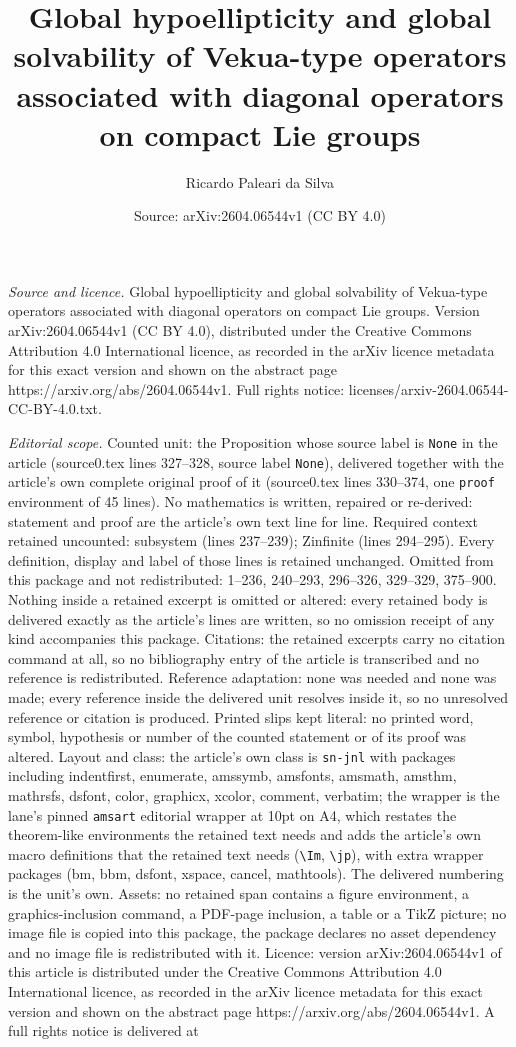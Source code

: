 \documentclass[10pt,a4paper]{amsart}
\title[Global hypoellipticity and global solvability of Vekua-type ]{Global hypoellipticity and global solvability of Vekua-type operators associated with diagonal operators on compact Lie groups}
\author{Ricardo Paleari da Silva}
\date{Source: arXiv:2604.06544v1 (CC BY 4.0)}
\begin{document}
\maketitle

\noindent\emph{Source and licence.} Global hypoellipticity and global solvability of Vekua-type operators associated with diagonal operators on compact Lie groups. Version arXiv:2604.06544v1 (CC BY 4.0), distributed under the Creative Commons Attribution 4.0 International licence, as recorded in the arXiv licence metadata for this exact version and shown on the abstract page https://arxiv.org/abs/2604.06544v1. Full rights notice: licenses/arxiv-2604.06544-CC-BY-4.0.txt.\par\smallskip

\noindent\textit{Editorial scope.} Counted unit: the Proposition whose source label is \texttt{None} in the article (source0.tex lines 327--328, source label \texttt{None}), delivered together with the article's own complete original proof of it (source0.tex lines 330--374, one \texttt{proof} environment of 45 lines). No mathematics is written, repaired or re-derived: statement and proof are the article's own text line for line. Required context retained uncounted: subsystem (lines 237--239); Zinfinite (lines 294--295). Every definition, display and label of those lines is retained unchanged. Omitted from this package and not redistributed: 1--236, 240--293, 296--326, 329--329, 375--900. Nothing inside a retained excerpt is omitted or altered: every retained body is delivered exactly as the article's lines are written, so no omission receipt of any kind accompanies this package. Citations: the retained excerpts carry no citation command at all, so no bibliography entry of the article is transcribed and no reference is redistributed. Reference adaptation: none was needed and none was made; every reference inside the delivered unit resolves inside it, so no unresolved reference or citation is produced. Printed slips kept literal: no printed word, symbol, hypothesis or number of the counted statement or of its proof was altered. Layout and class: the article's own class is \texttt{sn-jnl} with packages including indentfirst, enumerate, amssymb, amsfonts, amsmath, amsthm, mathrsfs, dsfont, color, graphicx, xcolor, comment, verbatim; the wrapper is the lane's pinned \texttt{amsart} editorial wrapper at 10pt on A4, which restates the theorem-like environments the retained text needs and adds the article's own macro definitions that the retained text needs (\texttt{\textbackslash Im}, \texttt{\textbackslash jp}), with extra wrapper packages (bm, bbm, dsfont, xspace, cancel, mathtools). The delivered numbering is the unit's own. Assets: no retained span contains a figure environment, a graphics-inclusion command, a PDF-page inclusion, a table or a TikZ picture; no image file is copied into this package, the package declares no asset dependency and no image file is redistributed with it. Licence: version arXiv:2604.06544v1 of this article is distributed under the Creative Commons Attribution 4.0 International licence, as recorded in the arXiv licence metadata for this exact version and shown on the abstract page https://arxiv.org/abs/2604.06544v1. A full rights notice is delivered at 
\end{document}
